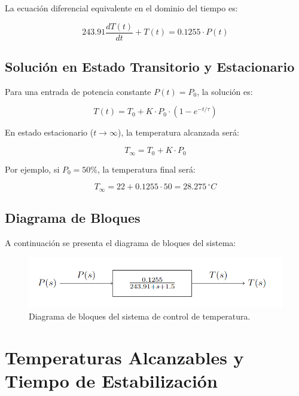 \documentclass[spanish, a4paper, 11pt]{article}
\begin{document}
La ecuación diferencial equivalente en el dominio del tiempo es:

\begin{equation}
    243.91 \frac{dT(t)}{dt} + T(t) = 0.1255 \cdot P(t)
\end{equation}

\subsection{Solución en Estado Transitorio y Estacionario}

Para una entrada de potencia constante \(P(t) = P_0\), la solución es:

\begin{equation}
    T(t) = T_0 + K \cdot P_0 \cdot \left(1 - e^{-t/\tau}\right)
\end{equation}

En estado estacionario (\(t \to \infty\)), la temperatura alcanzada será:

\begin{equation}
    T_{\infty} = T_0 + K \cdot P_0
\end{equation}

Por ejemplo, si \(P_0 = 50\%\), la temperatura final será:

\begin{equation}
    T_{\infty} = 22 + 0.1255 \cdot 50 = 28.275 \, ^\circ C
\end{equation}

\subsection{Diagrama de Bloques}

A continuación se presenta el diagrama de bloques del sistema:

\begin{figure}[ht]
    \centering
    \includegraphics[width=1\textwidth]{./figures/DiagramaBloques.png}
    \caption{Diagrama de bloques del sistema de control de temperatura.}
\end{figure}
\FloatBarrier


\section{Temperaturas Alcanzables y Tiempo de Estabilización}
\end{document}
